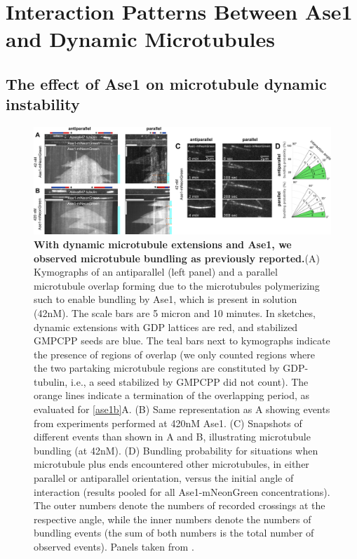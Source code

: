 \IntClearDoublePage
\section{Interaction Patterns Between Ase1 and Dynamic Microtubules}
\label{sec:Ase1}

\subsection{The effect of Ase1 on microtubule dynamic instability}
\label{sec:ase11}
\begin{figure}[h]
    \centering
    \includegraphics[width=1\linewidth]{Figures/ase1_1a.png}
    \caption[With dynamic microtubule extensions and Ase1, we observed microtubule bundling as previously reported.]{
    \textbf{With dynamic microtubule extensions and Ase1, we observed microtubule bundling as previously reported.}(A) Kymographs of an antiparallel (left panel) and a parallel microtubule overlap forming due to the microtubules polymerizing such to enable bundling by Ase1, which is present in solution (42nM). The scale bars are 5 micron and 10 minutes. In sketches, dynamic extensions with GDP lattices are red, and stabilized GMPCPP seeds are blue. The teal bars next to kymographs indicate the presence of regions of overlap (we only counted regions where the two partaking microtubule regions are constituted by GDP-tubulin, i.e., a seed stabilized by GMPCPP did not count). The orange lines indicate a termination of the overlapping period, as evaluated for \autoref{ase1b}A. (B) Same representation as A showing events from experiments performed at 420nM Ase1. (C) Snapshots of different events than shown in A and B, illustrating microtubule bundling (at 42nM). (D) Bundling probability for situations when microtubule plus ends encountered other microtubules, in either parallel or antiparallel orientation, versus the initial angle of interaction (results pooled for all Ase1-mNeonGreen concentrations). The outer numbers denote the numbers of recorded crossings at the respective angle, while the inner numbers denote the numbers of bundling events (the sum of both numbers is the total number of observed events). Panels taken from \cite{Krattenmacher2024}.
        }\label{ase1a}
\end{figure}
